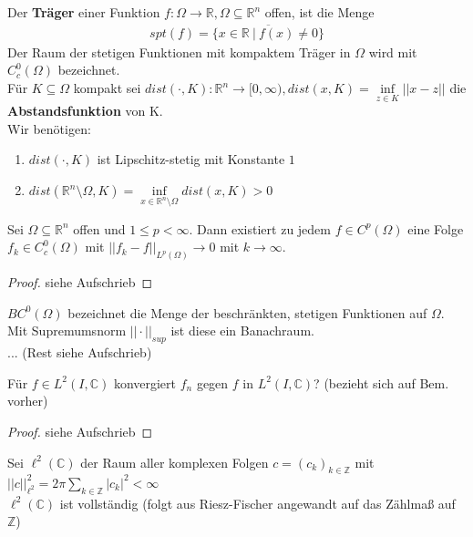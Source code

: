   \begin{definition}
    Der \textbf{Träger} einer Funktion $f:\Omega \to \mathbb{R}, \Omega \subseteq \mathbb{R}^n$ offen, ist die Menge 
    \begin{align*}
      spt(f) = \overline{\{x \in \mathbb{R} \ | \ f(x) \neq 0\}}
    \end{align*}
    Der Raum der stetigen Funktionen mit kompaktem Träger in $\Omega$ wird mit $C_c^0(\Omega)$ bezeichnet.\\
    Für $K \subseteq \Omega$ kompakt sei $dist(\cdot, K): \mathbb{R}^n \to [0, \infty), dist(x, K) = \inf\limits_{z \in K} ||x - z||$ die \textbf{Abstandsfunktion} von K.\\
    Wir benötigen:
    \begin{enumerate}
      \item $dist(\cdot, K)$ ist Lipschitz-stetig mit Konstante $1$
      \item $dist(\mathbb{R}^n \setminus \Omega, K) = \inf\limits_{x \in \mathbb{R}^n \setminus \Omega} dist(x, K) > 0$
    \end{enumerate}
  \end{definition}

  \begin{theorem}
    Sei $\Omega \subseteq \mathbb{R}^n$ offen und $1 \leq p < \infty$. Dann existiert zu jedem $f \in C^p(\Omega)$ eine Folge $f_k \in C_c^0(\Omega)$ mit $|| f_k - f||_{L^p(\Omega)} \to 0$ mit $k \to \infty$.
  \end{theorem}
  \begin{proof}
    siehe Aufschrieb
  \end{proof}

  \begin{remark}
    $BC^0(\Omega)$ bezeichnet die Menge der beschränkten, stetigen Funktionen auf $\Omega$. Mit Supremumsnorm $||\cdot||_{sup}$ ist diese ein Banachraum.\\
    ... (Rest siehe Aufschrieb)
  \end{remark}

  \begin{theorem}
    Für $f \in L^2(I, \mathbb{C})$ konvergiert $f_n$ gegen $f$ in $L^2(I, \mathbb{C})$? (bezieht sich auf Bem. vorher)
  \end{theorem}
  \begin{proof}
    siehe Aufschrieb
  \end{proof}

  \begin{remark}
    Sei $\ell^2(\mathbb{C})$ der Raum aller komplexen Folgen $c = (c_k)_{k \in \mathbb{Z}}$ mit $||c||_{\ell^2}^2 = 2 \pi \sum\limits_{k \in \mathbb{Z}} |c_k|^2 < \infty$\\
    $\ell^2(\mathbb{C})$ ist vollständig (folgt aus Riesz-Fischer angewandt auf das Zählmaß auf $\mathbb{Z}$)
  \end{remark}

